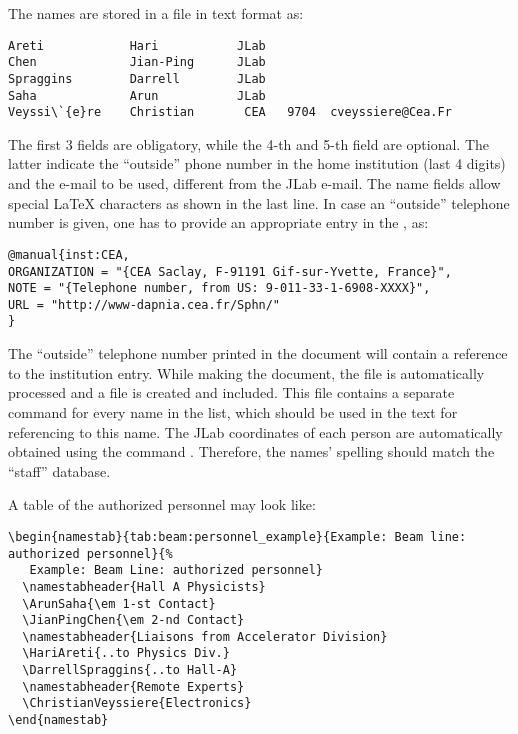 \documentclass[12pt,letterpaper]{article}
\begin{document}
The names are stored in a file  in text
format as:
{\color{blue}
  \begin{verbatim}
Areti            Hari           JLab
Chen             Jian-Ping      JLab 
Spraggins        Darrell        JLab
Saha             Arun           JLab
Veyssi\`{e}re    Christian       CEA   9704  cveyssiere@Cea.Fr   
  \end{verbatim}%
}\noindent
The first 3 fields are obligatory, while the 4-th and 5-th field
are optional. The latter indicate the ``outside'' phone number in the home institution 
(last 4 digits) and the e-mail to be used, different from the JLab e-mail. The name fields
allow special \LaTeX{} characters as shown in the last line. In case
an ``outside'' telephone number is given, one has to provide an appropriate entry
in the , as:
{\color{blue}
  \begin{verbatim}
@manual{inst:CEA,
ORGANIZATION = "{CEA Saclay, F-91191 Gif-sur-Yvette, France}",
NOTE = "{Telephone number, from US: 9-011-33-1-6908-XXXX}",
URL = "http://www-dapnia.cea.fr/Sphn/"
}
  \end{verbatim}%
}\noindent
The ``outside'' telephone number printed in the document will contain a reference to the
institution entry.
While making the document,
the file  is automatically processed and a file
 is created and included. This file contains
a separate command for every name in the list, which should be used
in the text for referencing to this name. The JLab coordinates of each person
are automatically obtained using the command . Therefore,
the names' spelling should match the ``staff'' database. 

A table of the authorized personnel may look like:
{\color{blue}
  \begin{verbatim}
\begin{namestab}{tab:beam:personnel_example}{Example: Beam line: authorized personnel}{%
   Example: Beam Line: authorized personnel}
  \namestabheader{Hall A Physicists}
  \ArunSaha{\em 1-st Contact}
  \JianPingChen{\em 2-nd Contact}
  \namestabheader{Liaisons from Accelerator Division}
  \HariAreti{..to Physics Div.}
  \DarrellSpraggins{..to Hall-A}
  \namestabheader{Remote Experts}
  \ChristianVeyssiere{Electronics}
\end{namestab}
  \end{verbatim}%
}\noindent
\end{document}
